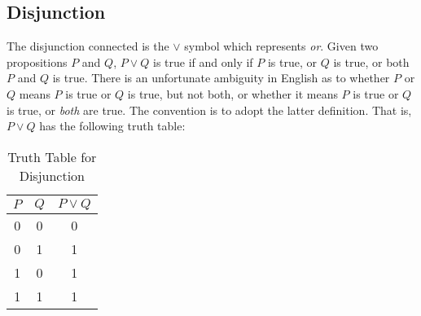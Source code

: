     \subsection{Disjunction}
        The disjunction connected is the $\lor$ symbol which represents
        \textit{or}. Given two propositions $P$ and $Q$, $P\lor{Q}$ is true if
        and only if $P$ is true, or $Q$ is true, or both $P$ and $Q$ is true.
        There is an unfortunate ambiguity in English as to whether $P$ or $Q$
        means $P$ is true or $Q$ is true, but not both, or whether it means
        $P$ is true or $Q$ is true, or \textit{both} are true. The convention is
        to adopt the latter definition. That is, $P\lor{Q}$ has the following
        truth table:
        \begin{table}[H]
            \centering
            \captionsetup{type=table}
            \begin{tabular}{ccc}
                $P$&$Q$&$P\lor{Q}$\\
                \hline
                0&0&0\\
                0&1&1\\
                1&0&1\\
                1&1&1
            \end{tabular}
            \caption{Truth Table for Disjunction}
            \label{tab:Truth_Table_for_Disjunction}
        \end{table}
